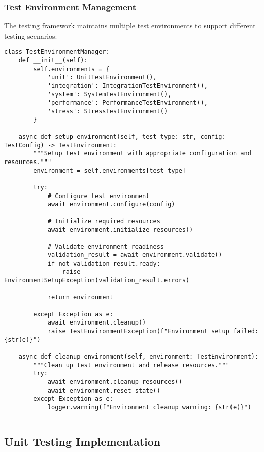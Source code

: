 \documentclass[12pt,a4paper]{article}
\begin{document}
\subsubsection{Test Environment Management}

The testing framework maintains multiple test environments to support different testing scenarios:

\begin{verbatim}
class TestEnvironmentManager:
    def __init__(self):
        self.environments = {
            'unit': UnitTestEnvironment(),
            'integration': IntegrationTestEnvironment(),
            'system': SystemTestEnvironment(),
            'performance': PerformanceTestEnvironment(),
            'stress': StressTestEnvironment()
        }
        
    async def setup_environment(self, test_type: str, config: TestConfig) -> TestEnvironment:
        """Setup test environment with appropriate configuration and resources."""
        environment = self.environments[test_type]
        
        try:
            # Configure test environment
            await environment.configure(config)
            
            # Initialize required resources
            await environment.initialize_resources()
            
            # Validate environment readiness
            validation_result = await environment.validate()
            if not validation_result.ready:
                raise EnvironmentSetupException(validation_result.errors)
            
            return environment
            
        except Exception as e:
            await environment.cleanup()
            raise TestEnvironmentException(f"Environment setup failed: {str(e)}")
    
    async def cleanup_environment(self, environment: TestEnvironment):
        """Clean up test environment and release resources."""
        try:
            await environment.cleanup_resources()
            await environment.reset_state()
        except Exception as e:
            logger.warning(f"Environment cleanup warning: {str(e)}")
\end{verbatim}

\hrule

\subsection{Unit Testing Implementation}
\end{document}
